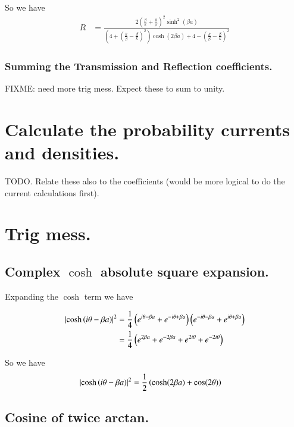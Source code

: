 \documentclass{article}
\begin{document}
So we have
\begin{align}
R 
&= \frac{2 
\left(\frac{\beta}{k} + \frac{k}{\beta} \right)^2 
\sinh^2( \beta a)} { 
\left(4 + \left( \frac{k}{\beta} -\frac{\beta}{k} \right)^2 \right)
\cosh(2\beta a)
+ 
4 - \left(\frac{k}{\beta} - \frac{\beta}{k} \right)^2 
}
\end{align}

\subsubsection{ Summing the Transmission and Reflection coefficients. }

FIXME:
need more trig mess.  Expect these to sum to unity.

\section{ Calculate the probability currents and densities. }

TODO.  Relate these also to the coefficients (would be more logical to do the current calculations first).

\section{ Trig mess. }

\subsection{ Complex $\cosh$ absolute square expansion. }

Expanding the $\cosh$ term we have

\begin{align*}
\left\lvert{\cosh\left( i\theta -\beta a \right)}\right\rvert^2
&=
\frac{1}{4}
\left(
e^{i\theta - \beta a}
+ e^{-i\theta + \beta a}
\right)
\left(
e^{-i\theta - \beta a}
+ e^{i\theta + \beta a}
\right) \\
&=
\frac{1}{4}\left(
e^{2\beta a}
+ e^{-2\beta a}
+e^{2i\theta }
+e^{-2i\theta }
\right) \\
\end{align*}

So we have
\begin{align}\label{eqn:coshSquared}
\left\lvert{\cosh\left( i\theta -\beta a \right)}\right\rvert^2
&=\frac{1}{2}
\left( \cosh(2\beta a) + \cos(2\theta) \right)
\end{align}

\subsection{ Cosine of twice arctan. }
\end{document}
